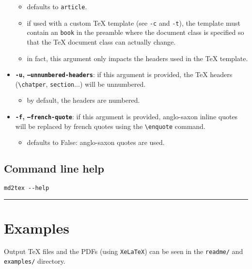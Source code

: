\documentclass[a4paper, 12pt, twoside]{book}
\begin{document}
\begin{itemize}
\begin{itemize} 
 \item defaults to \texttt{article}.
\item if used with a custom TeX template (see \texttt{-c} and \texttt{-t}), the template must contain an \texttt{book} 	 in the preamble where the document class is specified so that the TeX document class can actually change.
\item in fact, this argument only impacts the headers used in the TeX template.
\end{itemize}
\item \textbf{\texttt{-u}, \texttt{--unnumbered-headers}}: if this argument is provided, the TeX headers (\texttt{\textbackslash{}chatper}, \texttt{section}...) will be unnumbered.
\begin{itemize} 
 \item by default, the headers are numbered.
\end{itemize}
\item \textbf{\texttt{-f}, \texttt{--french-quote}}: if this argument is provided, anglo-saxon inline quotes will be replaced by french quotes using the \texttt{\textbackslash{}enquote} command.
\begin{itemize} 
 \item defaults to False: anglo-saxon quotes are used. 
\end{itemize}
\end{itemize}
\subsection*{Command line help}

\begin{listing}[h!]
   \begin{verbatim}
md2tex --help

   \end{verbatim}
\end{listing}

\par\noindent\rule{\linewidth}{0.4pt}
\section*{Examples}

Output TeX files and the PDFs (using \texttt{XeLaTeX}) can be seen in the \texttt{readme/} and \texttt{examples/} directory.
\end{document}

